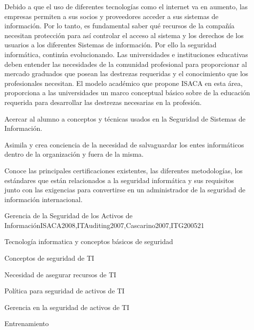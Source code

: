 \begin{syllabus}
\begin{justification}
Debido a que el uso de diferentes tecnologías como el internet va en aumento, las empresas permiten a sus socios y proveedores acceder a sus sistemas de información. Por lo tanto, es fundamental saber qué recursos de la compañía necesitan protección para así controlar el acceso al sistema y los derechos de los usuarios a los diferentes Sistemas de información.  Por ello la seguridad informática, continúa evolucionando. Las universidades e instituciones educativas deben entender las necesidades de la comunidad profesional para proporcionar al mercado graduados que posean las destrezas requeridas y el conocimiento que los profesionales necesitan. El modelo académico que propone  ISACA en esta área, proporciona a las universidades un marco conceptual básico sobre de la educación requerida para desarrollar las destrezas necesarias en la profesión.
\end{justification}

\begin{goals}
\item Acercar al alumno a conceptos y técnicas usados en la Seguridad de Sistemas de Información.
\item Asimila y crea conciencia de la necesidad de salvaguardar los entes informáticos dentro de la organización y fuera de la misma.
\item Conoce las principales certificaciones existentes, las diferentes metodologías, los estándares que están relacionados a la seguridad informática y sus requisitos junto con las exigencias para convertirse en un administrador de la seguridad de información internacional.
\end{goals}

\begin{outcomes}
\end{outcomes}

\begin{unit}{Gerencia de la Seguridad de los Activos de Información}{ISACA2008,ITAuditing2007,Cascarino2007,ITG2005}{2}{1}
\begin{topics}
\item Tecnología informatica y conceptos básicos de seguridad
\item Conceptos de seguridad de TI 
\item Necesidad de asegurar recursos de TI
\item Política para seguridad de activos de TI 
\item Gerencia en la seguridad de activos de TI 
\item Entrenamiento
\end{topics}


\end{unit}
\end{syllabus}

